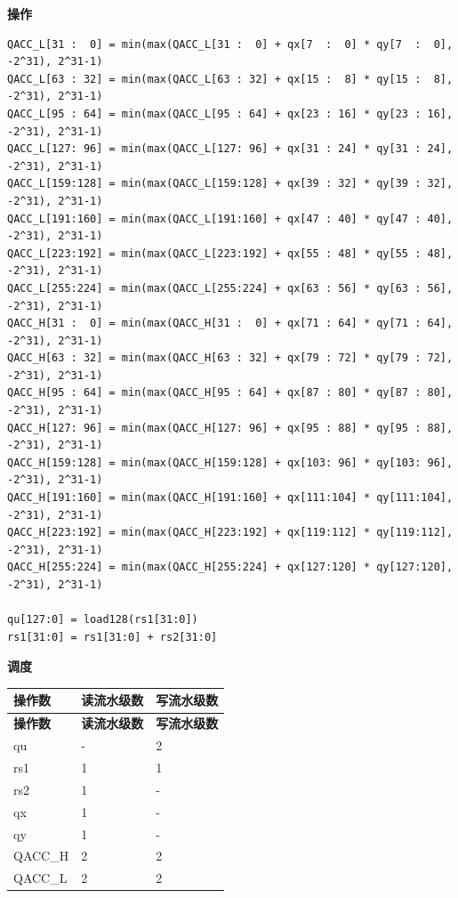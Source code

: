 \textbf{操作}\\
\begin{lstlisting}
QACC_L[31 :  0] = min(max(QACC_L[31 :  0] + qx[7  :  0] * qy[7  :  0], -2^31), 2^31-1)
QACC_L[63 : 32] = min(max(QACC_L[63 : 32] + qx[15 :  8] * qy[15 :  8], -2^31), 2^31-1)
QACC_L[95 : 64] = min(max(QACC_L[95 : 64] + qx[23 : 16] * qy[23 : 16], -2^31), 2^31-1)
QACC_L[127: 96] = min(max(QACC_L[127: 96] + qx[31 : 24] * qy[31 : 24], -2^31), 2^31-1)
QACC_L[159:128] = min(max(QACC_L[159:128] + qx[39 : 32] * qy[39 : 32], -2^31), 2^31-1)
QACC_L[191:160] = min(max(QACC_L[191:160] + qx[47 : 40] * qy[47 : 40], -2^31), 2^31-1)
QACC_L[223:192] = min(max(QACC_L[223:192] + qx[55 : 48] * qy[55 : 48], -2^31), 2^31-1)
QACC_L[255:224] = min(max(QACC_L[255:224] + qx[63 : 56] * qy[63 : 56], -2^31), 2^31-1)
QACC_H[31 :  0] = min(max(QACC_H[31 :  0] + qx[71 : 64] * qy[71 : 64], -2^31), 2^31-1)
QACC_H[63 : 32] = min(max(QACC_H[63 : 32] + qx[79 : 72] * qy[79 : 72], -2^31), 2^31-1)
QACC_H[95 : 64] = min(max(QACC_H[95 : 64] + qx[87 : 80] * qy[87 : 80], -2^31), 2^31-1)
QACC_H[127: 96] = min(max(QACC_H[127: 96] + qx[95 : 88] * qy[95 : 88], -2^31), 2^31-1)
QACC_H[159:128] = min(max(QACC_H[159:128] + qx[103: 96] * qy[103: 96], -2^31), 2^31-1)
QACC_H[191:160] = min(max(QACC_H[191:160] + qx[111:104] * qy[111:104], -2^31), 2^31-1)
QACC_H[223:192] = min(max(QACC_H[223:192] + qx[119:112] * qy[119:112], -2^31), 2^31-1)
QACC_H[255:224] = min(max(QACC_H[255:224] + qx[127:120] * qy[127:120], -2^31), 2^31-1)

qu[127:0] = load128(rs1[31:0])
rs1[31:0] = rs1[31:0] + rs2[31:0]
\end{lstlisting}

\textbf{调度}\\
\begin{longtable}[c]{|l|l|l|}
    \hline
    \rowcolor{lightgray}
    \textbf{操作数} & \textbf{读流水级数} & \textbf{写流水级数} \\\hline
    \endfirsthead
    \hline
    \rowcolor{lightgray}
     \textbf{操作数} & \textbf{读流水级数} & \textbf{写流水级数} \\\hline
    \endhead
    \hline
    \endfoot

    qu & - & 2 \\\hline
    rs1 & 1 & 1 \\\hline
    rs2 & 1 & - \\\hline
     qx & 1 & - \\\hline
     qy & 1 & - \\\hline
     QACC\_H & 2 & 2 \\\hline
     QACC\_L & 2 & 2

\end{longtable}

